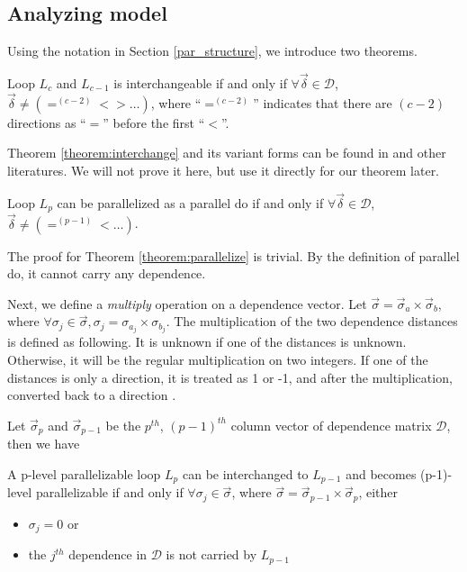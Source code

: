 \subsection{Analyzing model}

Using the notation in Section \ref{par_structure}, we introduce two
theorems.

\begin{theorem} \label{theorem:interchange}
  Loop $L_{c}$ and $L_{c-1}$ is interchangeable if and only if   
   $\forall \vec{\delta} \in \mathcal{D}$, $\vec{\delta} \neq
  (=^{(c-2)} < > \ldots)$, where ``$=^{(c-2)}$'' indicates that there are
  $(c-2)$ directions as ``$=$'' before the first ``$<$''.
\end{theorem} 

Theorem \ref{theorem:interchange} and its variant forms can be found
in \cite{Zim90} and other literatures. We will not prove it here, but 
use it directly for our theorem later.

\begin{theorem} \label{theorem:parallelize}
  Loop $L_{p}$ can be parallelized as a parallel do if and only if
   $\forall \vec{\delta} \in \mathcal{D}$, $\vec{\delta} \neq
  (=^{(p-1)} < \ldots)$.
\end{theorem} 

The proof for Theorem \ref{theorem:parallelize} is trivial. By the
definition of parallel do, it cannot carry any dependence.

Next, we define a \emph{multiply} operation on a dependence vector.
Let $ \vec\sigma=\vec{\sigma}_{a} \times \vec{\sigma}_{b}$, where
$\forall \sigma_{j} \in \vec\sigma, \sigma_{j} = \sigma_{a_{j}} \times
\sigma_{b_{j}}$. The multiplication of the two dependence distances is
defined as following. It is unknown if one of the distances is unknown.
Otherwise, it will be the regular multiplication on two integers. If
one of the distances is only a direction, it is treated as 1 or -1, and
after the multiplication, converted back to a direction .

Let $\vec{\sigma}_{p}$ and $\vec{\sigma}_{p-1}$ be the $p^{th}$,
$(p-1)^{th}$ column vector of dependence matrix $\mathcal{D}$, then we
have

\begin{theorem} \label{theorem:keep}
  A p-level parallelizable loop $L_{p}$ can be interchanged to
  $L_{p-1}$ and becomes (p-1)-level parallelizable if and only if 
  $\forall \sigma_{j} \in \vec{\sigma}$, where $\vec{\sigma} =
  \vec{\sigma}_{p-1} \times \vec{\sigma}_{p}$, either
  \begin{itemize}
  \item $\sigma_{j}=0$ or 
  \item the $j^{th}$ dependence in $\mathcal{D}$ is not carried by
    $L_{p-1}$
  \end{itemize}
\end{theorem} 

